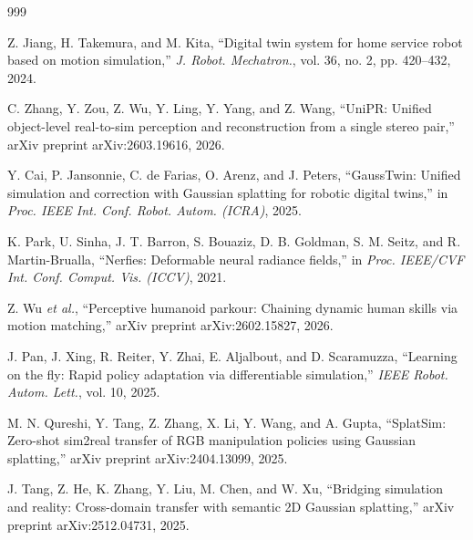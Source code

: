 \documentclass[12pt,a4paper,oneside]{report}
\begin{document}
\begin{thebibliography}{999}

Z. Jiang, H. Takemura, and M. Kita, ``Digital twin system for home service robot based on motion simulation,'' \textit{J. Robot. Mechatron.}, vol. 36, no. 2, pp. 420--432, 2024.




C. Zhang, Y. Zou, Z. Wu, Y. Ling, Y. Yang, and Z. Wang, ``{UniPR}: Unified object-level real-to-sim perception and reconstruction from a single stereo pair,'' arXiv preprint arXiv:2603.19616, 2026.




Y. Cai, P. Jansonnie, C. de Farias, O. Arenz, and J. Peters, ``{GaussTwin}: Unified simulation and correction with Gaussian splatting for robotic digital twins,'' in \textit{Proc. IEEE Int. Conf. Robot. Autom. (ICRA)}, 2025.




K. Park, U. Sinha, J. T. Barron, S. Bouaziz, D. B. Goldman, S. M. Seitz, and R. Martin-Brualla, ``Nerfies: Deformable neural radiance fields,'' in \textit{Proc. IEEE/CVF Int. Conf. Comput. Vis. (ICCV)}, 2021.




Z. Wu \textit{et al.}, ``Perceptive humanoid parkour: Chaining dynamic human skills via motion matching,'' arXiv preprint arXiv:2602.15827, 2026.




J. Pan, J. Xing, R. Reiter, Y. Zhai, E. Aljalbout, and D. Scaramuzza, ``Learning on the fly: Rapid policy adaptation via differentiable simulation,'' \textit{IEEE Robot. Autom. Lett.}, vol. 10, 2025.




M. N. Qureshi, Y. Tang, Z. Zhang, X. Li, Y. Wang, and A. Gupta, ``{SplatSim}: Zero-shot sim2real transfer of {RGB} manipulation policies using Gaussian splatting,'' arXiv preprint arXiv:2404.13099, 2025.




J. Tang, Z. He, K. Zhang, Y. Liu, M. Chen, and W. Xu, ``Bridging simulation and reality: Cross-domain transfer with semantic 2D Gaussian splatting,'' arXiv preprint arXiv:2512.04731, 2025.




\end{thebibliography}
\end{document}
